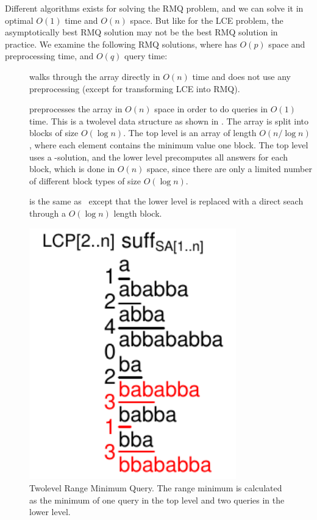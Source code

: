 \documentclass[a4]{article}
\newcommand*{\pref}{\prettyref}
\begin{document}
Different algorithms exists for solving the RMQ problem, and we can solve it in optimal $O(1)$ time and $O(n)$ space. But like for the LCE problem, the asymptotically best RMQ solution may not be the best RMQ solution in practice. We examine the following RMQ solutions, where  has $O(p)$ space and preprocessing time, and $O(q)$ query time:
\begin{samepage}
\begin{description}
\item[\RMQn] walks through the array directly in $O(n)$ time and does not use any preprocessing (except for transforming LCE into RMQ).
\item[\RMQq] preprocesses the array in $O(n)$ space in order to do queries in $O(1)$ time. This is a twolevel data structure as shown in \pref{fig:sa+lcp+min-twolevel}. The array is split into blocks of size $O(\log n)$. The top level is an array of length $O(n/\log n)$, where each element contains the minimum value one block. The top level uses a -solution, and the lower level precomputes all answers for each block, which is done in $O(n)$ space, since there are only a limited number of different block types of size $O(\log n)$.
\item[\RMQlog] is the same as \RMQq\ except that the lower level is replaced with a direct seach through a $O(\log n)$ length block.
\end{description}
\end{samepage}

\begin{figure}[tp]
    \begin{center}
        \includegraphics[width=0.8\textwidth,page=2]{sa+lcp+min.pdf}
    \end{center}
    \caption{\label{fig:sa+lcp+min-twolevel}Twolevel Range Minimum Query. The range minimum is calculated as the minimum of one query in the top level and two queries in the lower level.}
\end{figure}
\end{document}
